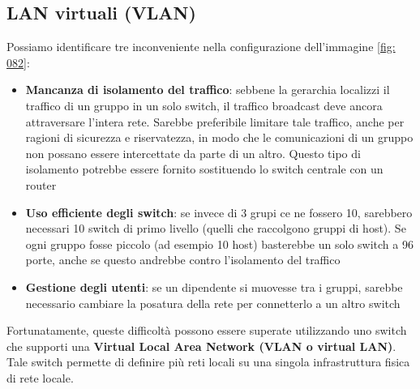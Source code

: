 \documentclass[11pt,a4paper]{book}
\begin{document}
\subsection{LAN virtuali (VLAN)}
Possiamo identificare tre inconveniente nella configurazione dell'immagine \ref{fig: 082}:
\begin{itemize}
	\item \textbf{Mancanza di isolamento del traffico}: sebbene la gerarchia localizzi il traffico di un gruppo in un solo switch, il traffico broadcast deve ancora attraversare l'intera rete. Sarebbe preferibile limitare tale traffico, anche per ragioni di sicurezza e riservatezza, in modo che le comunicazioni di un gruppo non possano essere intercettate da parte di un altro. Questo tipo di isolamento potrebbe essere fornito sostituendo lo switch centrale con un router
	\item \textbf{Uso efficiente degli switch}: se invece di 3 grupi ce ne fossero 10, sarebbero necessari 10 switch di primo livello (quelli che raccolgono gruppi di host). Se ogni gruppo fosse piccolo (ad esempio 10 host) basterebbe un solo switch a 96 porte, anche se questo andrebbe contro l'isolamento del traffico
	\item \textbf{Gestione degli utenti}: se un dipendente si muovesse tra i gruppi, sarebbe necessario cambiare la posatura della rete per connetterlo a un altro switch
\end{itemize}
Fortunatamente, queste difficoltà possono essere superate utilizzando uno switch che supporti una \textbf{Virtual Local Area Network (VLAN o virtual LAN)}. Tale switch permette di definire più reti locali su una singola infrastruttura fisica di rete locale.
\end{document}
